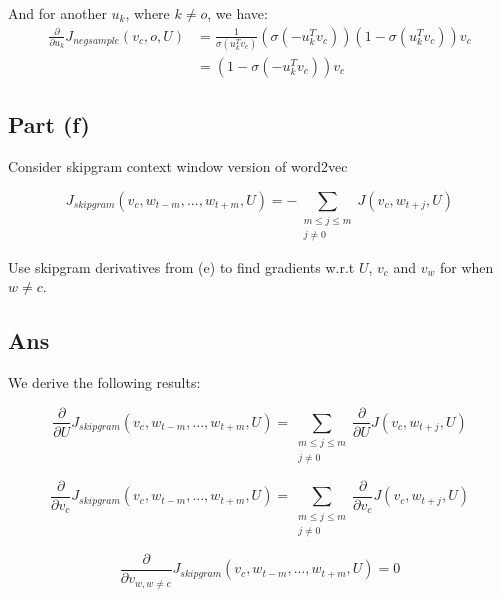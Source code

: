 \documentclass{article}
\begin{document}
And for another $u_k$, where $k \neq o$, we have:
\begin{align*}
\frac{\partial}{\partial u_k} J_{negsample}(v_c, o, U) 
&= \frac{1}{\sigma (u_k^T v_c)}(\sigma (-u_k^T v_c))(1 - \sigma (u_k^T v_c)) v_c \\
&= (1 - \sigma (-u_k^T v_c)) v_c
\end{align*}

\subsection*{Part (f)}
Consider skipgram context window version of word2vec

\begin{equation} J_{skipgram} (v_c, w_{t-m}, ..., w_{t+m}, U) = - \sum_{\substack{ m \leq j \leq m \\ j \neq 0}} J(v_c, w_{t+j}, U)
\end{equation}

Use skipgram derivatives from (e) to find gradients w.r.t $U$, $v_c$ and $v_w$ for when $w \neq c$.

\subsection*{Ans}
We derive the following results:

\begin{equation}
\frac{\partial}{\partial U} J_{skipgram} (v_c, w_{t-m}, ..., w_{t+m}, U) = \sum_{\substack{ m \leq j \leq m \\ j \neq 0}} \frac{\partial}{\partial U} J(v_c, w_{t+j}, U)
\end{equation}

\begin{equation}
\frac{\partial}{\partial v_c} J_{skipgram} (v_c, w_{t-m}, ..., w_{t+m}, U)  = \sum_{\substack{ m \leq j \leq m \\ j \neq 0}} \frac{\partial}{\partial v_c} J(v_c, w_{t+j}, U)
\end{equation}

\begin{equation}
\frac{\partial}{\partial v_{w, w \neq c}} J_{skipgram} (v_c, w_{t-m}, ..., w_{t+m}, U)  = 0
\end{equation}
\end{document}
